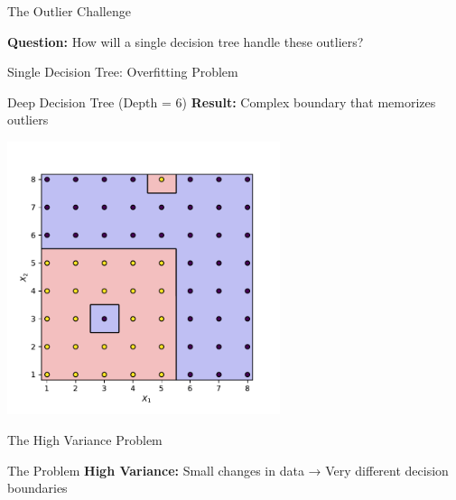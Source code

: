 \documentclass[10pt]{beamer}
\newcommand{\fitpic}[1]{\begin{adjustbox}{max width=\linewidth, max totalheight=0.78\textheight}#1\end{adjustbox}}
\begin{document}
\begin{frame}{The Outlier Challenge}
\begin{keypointsbox}
\textbf{Question:} How will a single decision tree handle these outliers?
\end{keypointsbox}
\end{frame}

\begin{frame}{Single Decision Tree: Overfitting Problem}
\begin{examplebox}{Deep Decision Tree (Depth = 6)}
\textbf{Result:} Complex boundary that memorizes outliers
\end{examplebox}

  \begin{center}
  \fitpic{\includegraphics[width = 0.6\textwidth]{../assets/ensemble/figures/strong-tree}}
  \end{center}
\end{frame}

\begin{frame}{The High Variance Problem}
\begin{alertbox}{The Problem}
\textbf{High Variance:} Small changes in data → Very different decision boundaries
\end{alertbox}
\end{frame}
\end{document}
